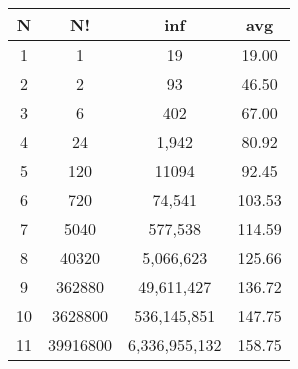 \documentclass{report}
\begin{document}
\begin{center}
\begin{tabular}{ |c | c | c | c| } 
 \hline
 N & N! & inf & avg \\
 \hline
 \hline
 1 & 1 & 19 & 19.00 \\
 \hline
 2 & 2 & 93 & 46.50 \\
 \hline
 3 & 6 & 402 & 67.00 \\
 \hline 
 4 & 24 & 1,942 & 80.92 \\
 \hline 
 5 & 120 & 11094 & 92.45 \\
 \hline
 6 & 720 & 74,541 & 103.53 \\
 \hline
 7 & 5040 & 577,538 & 114.59 \\
 \hline
 8 & 40320 & 5,066,623 & 125.66 \\
 \hline
 9 & 362880 & 49,611,427 & 136.72 \\
 \hline
 10 & 3628800 & 536,145,851 & 147.75 \\
 \hline
 11 & 39916800 & 6,336,955,132 & 158.75\\
 \hline
\end{tabular}
\end{center}
\end{document}
